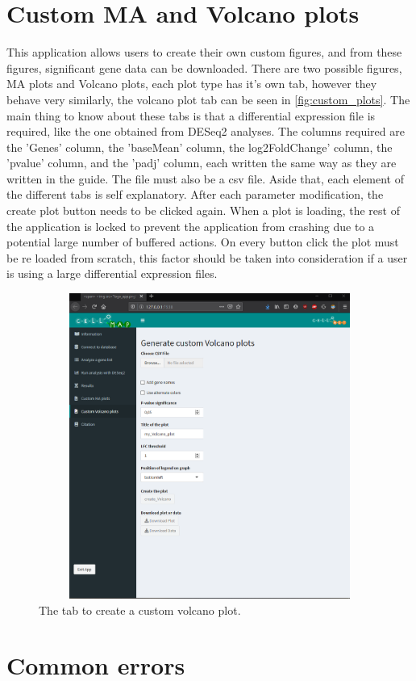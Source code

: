 \documentclass[11pt]{article}
\begin{document}
\section{Custom MA and Volcano plots \label{custom_plots}}
This application allows users to create their own custom figures, and from these figures, significant gene data can be downloaded. There are two possible figures, MA plots and Volcano plots, each plot type has it's own tab, however they behave very similarly, the volcano plot tab can be seen in \autoref{fig:custom_plots}. 
The main thing to know about these tabs is that a differential expression file is required, like the one obtained from DESeq2 analyses. The columns required are the 'Genes' column, the 'baseMean' column, the log2FoldChange' column, the 'pvalue' column, and the 'padj' column, each written the same way as they are written in the guide. The file must also be a csv file.
Aside that, each element of the different tabs is self explanatory. After each parameter modification, the create plot button needs to be clicked again. When a plot is loading, the rest of the application is locked to prevent the application from crashing due to a potential large number of buffered actions. On every button click the plot must be re loaded from scratch, this factor should be taken into consideration if a user is using a large differential expression files.

\begin{figure}[h!]
\centering
\includegraphics[width=15cm,height=10cm,keepaspectratio]{custom_volcano_tab.png}
\caption{The tab to create a custom volcano plot.}
\label{fig:custom_plots}
\end{figure}


\newpage
\section{Common errors \label{common_err}}



\end{document}
